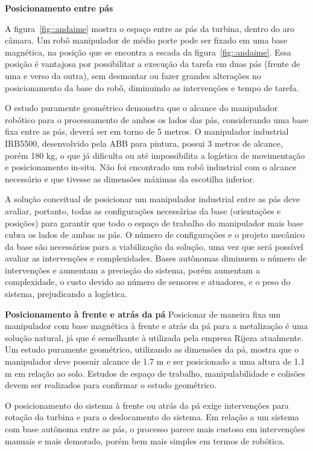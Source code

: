\textbf{Posicionamento entre pás}

A figura~\ref{fig::andaime} mostra o espaço entre as pás da turbina, dentro do
aro câmara. Um robô manipulador de médio porte pode ser fixado em uma base
magnética, na posição que se encontra a escada da figura~\ref{fig::andaime}.
Essa posição é vantajosa por possibilitar a execução da tarefa em duas pás
(frente de uma e verso da outra), sem desmontar ou fazer grandes alterações no
posicionamento da base do robô, diminuindo as intervenções e tempo de tarefa.

O estudo puramente geométrico demonstra que o alcance do manipulador robótico
para o processamento de ambos os lados das pás, considerando uma base fixa entre
as pás, deverá ser em torno de 5 metros. O manipulador industrial IRB5500,
desenvolvido pela ABB para pintura, possui 3 metros de alcance, porém 180 kg, o que já dificulta ou até impossibilita a
logística de movimentação e posicionamento in-situ. Não foi encontrado um robô
industrial com o alcance necessário e que tivesse as dimensões máximas da
escotilha inferior. 

A solução conceitual de posicionar um manipulador industrial entre as pás deve
avaliar, portanto, todas as configurações necessárias da base (orientações e
posições) para garantir que todo o espaço de trabalho do manipulador mais base
cubra os lados de ambas as pás. O número de configurações e o projeto
mecânico da base são necessários para a viabilização da solução,
uma vez que será possível avaliar as intervenções e complexidades. Bases
autônomas diminuem o número de intervenções e aumentam a precisção do sistema,
porém aumentam a complexidade, o custo devido ao número de sensores e atuadores,
e o peso do sistema, prejudicando a logística.

\textbf{Posicionamento à frente e atrás da pá}
Posicionar de maneira fixa um manipulador com base magnética à frente e atrás da
pá para a metalização é uma solução natural, já que é semelhante à utilizada pela
empresa Rijeza atualmente. Um estudo puramente geométrico, utilizando as
dimensões da pá, mostra que o manipulador deve possuir alcance de 1.7 m e ser
posicionado a uma altura de 1.1 m em relação ao solo. Estudos de espaço de
trabalho, manipulabilidade e colisões devem ser realizados para confirmar o
estudo geométrico.

O posicionamento do sistema à frente ou atrás da pá exige intervenções para
rotação da turbina e para o deslocamento do sistema. Em relação a um
sistema com base autônoma entre as pás, o processo parece mais custoso em
intervenções manuais e mais demorado, porém bem mais simples em termos de
robótica.

